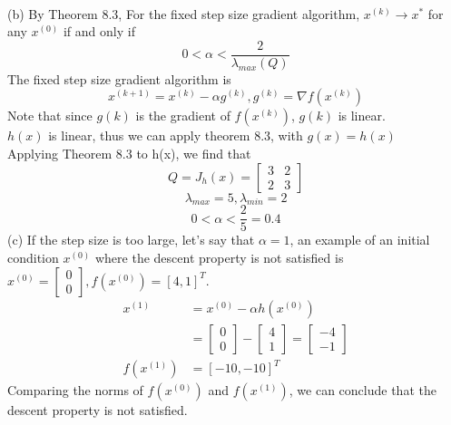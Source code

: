 \documentclass[12pt]{article}
\begin{document}
\\
(b) By Theorem 8.3, For the fixed step size gradient algorithm, $x^{(k)} \rightarrow x^{*}$ for any $x^{(0)}$ if and only if 
\[0 < \alpha < \frac{2}{\lambda_{max}(Q)}\]
The fixed step size gradient algorithm is
\[x^{(k+1)} = x^{(k)} - \alpha g^{(k)},
g^{(k)} = \nabla f(x^{(k)})
\]
Note that since $g(k)$ is the gradient of $f(x^{(k)})$, $g(k)$ is linear.\\
$h(x)$ is linear, thus we can apply theorem 8.3, with $g(x) = h(x)$ \\
Applying Theorem 8.3 to h(x), we find that
\[Q = J_h(x)= \begin{bmatrix}
  3 & 2 \\
  2 & 3
\end{bmatrix}\]
\[ \lambda_{max} = 5, \lambda_{min} = 2\]
\[0 < \alpha < \frac{2}{5} = 0.4\] 
(c)
If the step size is too large, let's say that $\alpha = 1$, an example of an initial condition $x^{(0)}$ where the
descent property is not satisfied is $x^{(0)} = \begin{bmatrix}0 \\ 0\end{bmatrix}, f(x^{(0)}) = [4,1]^T$.
\begin{align}
  x^{(1)} &= x^{(0)} - \alpha h(x^{(0)}) \\
  &= \begin{bmatrix}0 \\ 0\end{bmatrix} - \begin{bmatrix} 4 \\ 1 \end{bmatrix} = \begin{bmatrix} -4 \\ -1\end{bmatrix} \\
  f(x^{(1)}) &= [-10, -10]^T
\end{align}
Comparing the norms of $f(x^{(0)})$ and $f(x^{(1)})$, we can conclude that the descent property is not satisfied.
\end{document}
